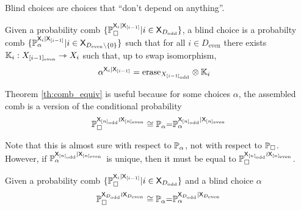Blind choices are choices that ``don't depend on anything''.

\begin{definition}
Given a probability comb $\{\mathbb{P}_\square^{\mathsf{X}_{i}|\mathsf{X}_{[i-1]}}|i\in \mathsf{X}_{D_{\text{odd}}}\}$, a blind choice is a probabilty comb $\{\mathbb{P}_\alpha^{\mathsf{X}_{i}|\mathsf{X}_{[i-1]}}|i\in \mathsf{X}_{D_{\text{even}}\setminus \{0\}}\}$ such that for all $i\in D_{\text{even}}$ there exists $\mathbb{K}_i:X_{[i-1]_\mathrm{even}}\rightarrowtriangle X_i$ such that, up to swap isomorphism,
\begin{align}
	\alpha^{\mathsf{X}_{i}|\mathsf{X}_{[i-1]}} &= \mathrm{erase}_{X_{[i-1]_{\text{odd}}}} \otimes \mathbb{K}_i
\end{align}
\end{definition}

Theorem \ref{th:comb_equiv} is useful because for some choices $\alpha$, the assembled comb is a version of the conditional probability
\begin{align}
\mathbb{P}_\square^{\mathsf{X}_{[n]_{\text{odd}}}\wr \mathsf{X}_{[n]_{\text{even}}}}\cong{\ensuremath{\mathbb{P}}_\alpha}{=}\mathbb{P}_\alpha^{\mathsf{X}_{[n]_{\text{odd}}}| \mathsf{X}_{[n]_{\text{even}}}}
\end{align}

Note that this is almost sure with respect to $\mathbb{P}_\alpha$, not with respect to $\mathbb{P}_\square$. However, if $\mathbb{P}_\alpha^{\mathsf{X}_{[n]_{\text{odd}}}| \mathsf{X}_{[n]_{\text{even}}}}$ is unique, then it must be equal to $\mathbb{P}_\square^{\mathsf{X}_{[n]_{\text{odd}}}\wr \mathsf{X}_{[n]_{\text{even}}}}$.

\begin{theorem}\label{th:comb_conditional_correspondence}
Given a probability comb $\{\mathbb{P}_\square^{\mathsf{X}_{i}|\mathsf{X}_{[i-1]}}|i\in \mathsf{X}_{D_{\text{odd}}}\}$ and a blind choice $\alpha$
\begin{align}
\mathbb{P}_\square^{\mathsf{X}_{D_{\text{odd}}}\wr \mathsf{X}_{D_{\text{even}}}}\cong{\ensuremath{\mathbb{P}}_\alpha}{=}\mathbb{P}_\alpha^{\mathsf{X}_{D_{\text{odd}}}| \mathsf{X}_{D_{\text{even}}}}
\end{align}
\end{theorem}

